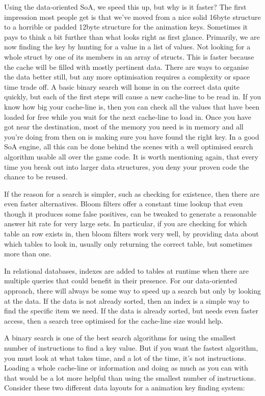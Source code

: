 Using the data-oriented SoA, we speed this up, but why is it faster? The first
impression most people get is that we've moved from a nice solid 16byte
structure to a horrible or padded 12byte structure for the animation keys.
Sometimes it pays to think a bit further than what looks right as first glance.
Primarily, we are now finding the key by hunting for a value in a list of
values. Not looking for a whole struct by one of its members in an array of
structs. This is faster because the cache will be filled with mostly pertinent
data. There are ways to organise the data better still, but any more
optimisation requires a complexity or space time trade off. A basic binary
search will home in on the correct data quite quickly, but each of the first
steps will cause a new cache-line to be read in.  If you know how big your
cache-line is, then you can check all the values that have been loaded for free
while you wait for the next cache-line to load in.  Once you have got near the
destination, most of the memory you need is in memory and all you're doing
from then on is making sure you have found the right key.  In a good SoA
engine, all this can be done behind the scenes with a well optimised search
algorithm usable all over the game code. It is worth mentioning again, that
every time you break out into larger data structures, you deny your proven
code the chance to be reused.

If the reason for a search is simpler, such as checking for existence, then
there are even faster alternatives. Bloom filters offer a constant time lookup
that even though it produces some false positives, can be tweaked to generate a
reasonable answer hit rate for very large sets. In particular, if you are
checking for which table an row exists in, then bloom filters work very well,
by providing data about which tables to look in, usually only returning the
correct table, but sometimes more than one.

In relational databases, indexes are added to tables at runtime when there are
multiple queries that could benefit in their presence. For our data-oriented
approach, there will always be some way to speed up a search but only by
looking at the data. If the data is not already sorted, then an index is a
simple way to find the specific item we need. If the data is already sorted,
but needs even faster access, then a search tree optimised for the cache-line
size would help.

A binary search is one of the best search algorithms for using the smallest
number of instructions to find a key value. But if you want the fastest
algorithm, you must look at what takes time, and a lot of the time, it's not
instructions. Loading a whole cache-line or information and doing as much as
you can with that would be a lot more helpful than using the smallest number of
instructions. Consider these two different data layouts for a animation key
finding system:


